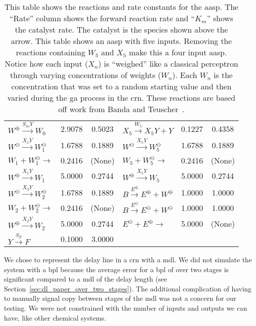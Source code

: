 \begin{table}[ht]
\begin{tabular}{lcc||lcc}
$W^{\oplus} \xrightarrow{S_{in}Y} W_0$            & 2.9078        & 0.5023               & $X_5 \xrightarrow{W_5} X_5Y + Y$                        & 0.1227        & 0.4358 \\
$W^{\ominus} \xrightarrow{X_{1}Y} W_1^{\ominus}$  & 1.6788        & 0.1889               & $W^{\ominus} \xrightarrow{X_5Y} W_5^{\ominus}$          & 1.6788        & 0.1889 \\
$W_1 + W_1^{\ominus} \rightarrow$                 & 0.2416        & (None)               & $W_5 + W_5^{\ominus} \rightarrow$                       & 0.2416        & (None) \\
$W^{\oplus} \xrightarrow{X_{1}Y} W_1$             & 5.0000        & 0.2744               & $W^{\oplus} \xrightarrow{X_5Y} W_5$                     & 5.0000        & 0.2744 \\
$W^{\ominus} \xrightarrow{X_{2}Y} W_2^{\ominus}$  & 1.6788        & 0.1889               & $B \xrightarrow{E^{\oplus}} E^{\oplus} + W^{\oplus}$    & 1.0000        & 1.0000 \\
$W_2 + W_2^{\ominus} \rightarrow$                 & 0.2416        & (None)               & $B \xrightarrow{E^{\ominus}} E^{\ominus} + W^{\ominus}$ & 1.0000        & 1.0000 \\
$W^{\oplus} \xrightarrow{X_{2}Y} W_2$             & 5.0000        & 0.2744               & $E^{\ominus} + E^{\oplus} \rightarrow$                  & 5.0000        & (None) \\
$Y \xrightarrow{S_F} F$                           & 0.1000        & 3.0000               & ~                                                       & ~             & ~
\end{tabular}
\caption[AASP Reaction Set]{This table shows the reactions and rate constants for the \gls{aasp}. The ``Rate'' column shows the forward reaction rate and ``$K_m$'' shows the catalyst rate. The catalyst is the species shown above the arrow. This table shows an \gls{aasp} with five inputs. Removing the reactions containing $W_5$ and $X_5$ make this a four input \gls{aasp}. Notice how each input ($X_n$) is ``weighed'' like a classical perceptron through varying concentrations of weights ($W_n$). Each $W_n$ is the concentration that was set to a random starting value and then varied during the \gls{ga} process in the \gls{crn}. These reactions are based off work from Banda and Teuscher~\cite{Banda2014-pf}.}
\label{tab:aasp_react}
\end{table}

We chose to represent the delay line in a \gls{crn} with a \gls{mdl}. We did not simulate the system with a \gls{bpl} because the average error for a \gls{bpl} of over two stages is significant compared to a \gls{mdl} of the delay length (see Section~\ref{sec:dl_paper_over_two_stages}). The additional complication of having to manually signal copy between stages of the \gls{mdl} was not a concern for our testing. We were not constrained with the number of inputs and outputs we can have, like other chemical systems.

